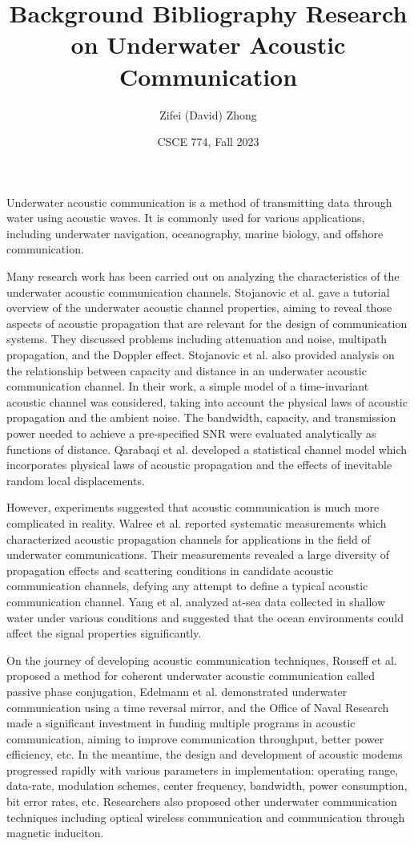 \documentclass[11pt, oneside]{article}   	%
\title{Background Bibliography Research on Underwater Acoustic Communication}
\author{Zifei (David) Zhong}
\date{CSCE 774, Fall 2023}							%
\begin{document}
\maketitle

Underwater acoustic communication is a method of transmitting data through water using acoustic waves. It is commonly used for various applications, including underwater navigation, oceanography, marine biology, and offshore communication. 

Many research work has been carried out on analyzing the characteristics of the underwater acoustic communication channels. Stojanovic et al.\cite{channelchar09} gave a tutorial overview of the underwater acoustic channel properties, aiming to reveal those aspects of acoustic propagation that are relevant for the design of communication systems. They discussed problems including attenuation and noise, multipath propagation, and the Doppler effect. Stojanovic et al.\cite{capdist07} also provided analysis on the relationship between capacity and distance in an underwater acoustic communication channel. In their work, a simple model of a time-invariant acoustic channel was considered, taking into account the physical laws of acoustic propagation and the ambient noise. The bandwidth, capacity, and transmission power needed to achieve a pre-specified SNR were evaluated analytically as functions of distance.  Qarabaqi et al.\cite{qarabaqi2013stats} developed a statistical channel model which incorporates physical laws of acoustic propagation and the effects of inevitable random local displacements.

However, experiments suggested that acoustic communication is much more complicated in reality.  Walree et al.\cite{van2013prop} reported systematic measurements which characterized acoustic propagation channels for applications in the field of underwater communications. Their measurements revealed a large diversity of propagation effects and scattering conditions in candidate acoustic communication channels, defying any attempt to define a typical acoustic communication channel. Yang et al.\cite{shallowwater12} analyzed at-sea data collected in shallow water under various conditions and suggested that the ocean environments could affect the signal properties significantly. 

On the journey of developing acoustic communication techniques, Rouseff et al.\cite{passivephase01} proposed a method for coherent underwater acoustic communication called passive phase conjugation, Edelmann et al. \cite{timereversal02} demonstrated underwater communication using a time reversal mirror, and the Office of Naval Research made a significant investment in funding multiple programs in acoustic communication\cite{growth09}, aiming to improve communication throughput, better power efficiency, etc. In the meantime, the design and development of acoustic modems progressed rapidly\cite{modem21} with various parameters in implementation: operating range, data-rate, modulation schemes, center frequency, bandwidth, power consumption, bit error rates, etc. Researchers also proposed other underwater communication techniques including optical wireless communication\cite{optical2016underwater} and communication through magnetic induciton\cite{magnetic15}.
\end{document}
